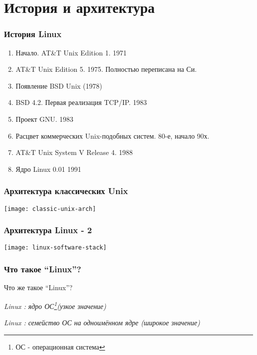 




\firstframe

\section{История и архитектура}

\begin{frame}
  \frametitle{История Linux}

  \begin{enumerate}
    \item Начало. AT\&T Unix Edition 1. 1971
    \item AT\&T Unix Edition 5. 1975. Полностью переписана на Си. 
    \item Появление BSD Unix (1978)
    \item BSD 4.2. Первая реализация TCP/IP. 1983
    \item Проект GNU. 1983 
    \item Расцвет коммерческих Unix-подобных систем. 80-е, начало 90х.
    \item AT\&T Unix System V Release 4. 1988
    \item Ядро Linux 0.01 1991 
  \end{enumerate}

\end{frame}

\begin{frame}
  \frametitle{Архитектура классических Unix}
    \texttt{[image: classic-unix-arch]}
\end{frame}


\begin{frame}
  \frametitle{Архитектура Linux - 2}

  \begin{center}
    \texttt{[image: linux-software-stack]}
  \end{center}

\end{frame}

\begin{frame}
  \frametitle{Что такое ``Linux''?}
  \begin{center}
    \alert{Что же такое ``Linux''?}
  \end{center}

  \pause 

  \emph{Linux : ядро ОС\footnote{ОС - операционная система}(узкое значение)}
  \newline
  \pause

  \emph{Linux : семейство ОС на одноимённом ядре (широкое значение)}

\end{frame}

